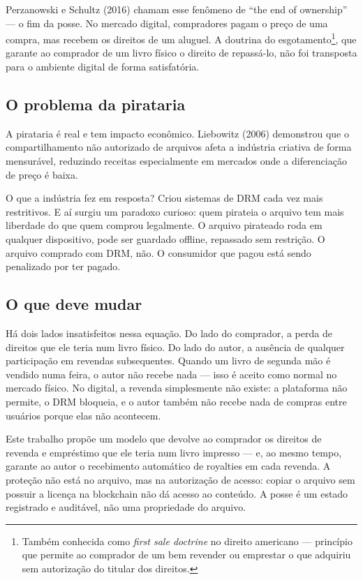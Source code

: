 \documentclass[12pt]{article}
\begin{document}
Perzanowski e Schultz (2016) chamam esse fenômeno de ``the end of ownership'' — o fim da posse. No mercado digital, compradores pagam o preço de uma compra, mas recebem os direitos de um aluguel. A doutrina do esgotamento\footnote{Também conhecida como \textit{first sale doctrine} no direito americano — princípio que permite ao comprador de um bem revender ou emprestar o que adquiriu sem autorização do titular dos direitos.}, que garante ao comprador de um livro físico o direito de repassá-lo, não foi transposta para o ambiente digital de forma satisfatória.

\subsection*{O problema da pirataria}

A pirataria é real e tem impacto econômico. Liebowitz (2006) demonstrou que o compartilhamento não autorizado de arquivos afeta a indústria criativa de forma mensurável, reduzindo receitas especialmente em mercados onde a diferenciação de preço é baixa.

O que a indústria fez em resposta? Criou sistemas de DRM cada vez mais restritivos. E aí surgiu um paradoxo curioso: quem pirateia o arquivo tem mais liberdade do que quem comprou legalmente. O arquivo pirateado roda em qualquer dispositivo, pode ser guardado offline, repassado sem restrição. O arquivo comprado com DRM, não. O consumidor que pagou está sendo penalizado por ter pagado.

\subsection*{O que deve mudar}

Há dois lados insatisfeitos nessa equação. Do lado do comprador, a perda de direitos que ele teria num livro físico. Do lado do autor, a ausência de qualquer participação em revendas subsequentes. Quando um livro de segunda mão é vendido numa feira, o autor não recebe nada — isso é aceito como normal no mercado físico. No digital, a revenda simplesmente não existe: a plataforma não permite, o DRM bloqueia, e o autor também não recebe nada de compras entre usuários porque elas não acontecem.

Este trabalho propõe um modelo que devolve ao comprador os direitos de revenda e empréstimo que ele teria num livro impresso — e, ao mesmo tempo, garante ao autor o recebimento automático de royalties em cada revenda. A proteção não está no arquivo, mas na autorização de acesso: copiar o arquivo sem possuir a licença na blockchain não dá acesso ao conteúdo. A posse é um estado registrado e auditável, não uma propriedade do arquivo.
\end{document}
